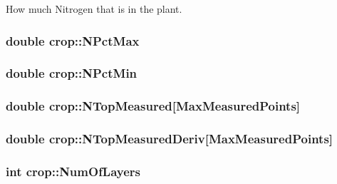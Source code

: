 How much Nitrogen that is in the plant. \hypertarget{classcrop_ab71cf78ab9ac2779deeb032e7b36e47d}{
\subsubsection[{NPctMax}]{\setlength{\rightskip}{0pt plus 5cm}double {\bf crop::NPctMax}}}
\label{classcrop_ab71cf78ab9ac2779deeb032e7b36e47d}
\hypertarget{classcrop_a64b16d0f5b047dbd1c1fcdde7fd09a87}{
\subsubsection[{NPctMin}]{\setlength{\rightskip}{0pt plus 5cm}double {\bf crop::NPctMin}}}
\label{classcrop_a64b16d0f5b047dbd1c1fcdde7fd09a87}
\hypertarget{classcrop_a1c9dc2dc8243ccdccb109ad9b578024b}{
\subsubsection[{NTopMeasured}]{\setlength{\rightskip}{0pt plus 5cm}double {\bf crop::NTopMeasured}\mbox{[}MaxMeasuredPoints\mbox{]}}}
\label{classcrop_a1c9dc2dc8243ccdccb109ad9b578024b}
\hypertarget{classcrop_ab47524d5cde79d0ad709a7e13524dac5}{
\subsubsection[{NTopMeasuredDeriv}]{\setlength{\rightskip}{0pt plus 5cm}double {\bf crop::NTopMeasuredDeriv}\mbox{[}MaxMeasuredPoints\mbox{]}}}
\label{classcrop_ab47524d5cde79d0ad709a7e13524dac5}
\hypertarget{classcrop_add8f384e82643550fa78abd7382abc4f}{
\subsubsection[{NumOfLayers}]{\setlength{\rightskip}{0pt plus 5cm}int {\bf crop::NumOfLayers}}}
\label{classcrop_add8f384e82643550fa78abd7382abc4f}


